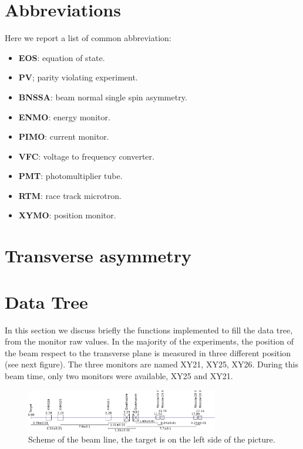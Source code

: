 \begin{appendices}

\section{Abbreviations}

Here we report a list of common abbreviation:

\begin{itemize}
\item \textbf{EOS}: equation of state.
\item \textbf{PV}; parity violating experiment.
\item \textbf{BNSSA}: beam normal single spin asymmetry.
\item \textbf{ENMO}: energy monitor.
\item \textbf{PIMO}: current monitor.
\item \textbf{VFC}: voltage to frequency converter.
\item \textbf{PMT}: photomultiplier tube.
\item \textbf{RTM}: race track microtron.
\item \textbf{XYMO}: position monitor.
\end{itemize} 

\section{Transverse asymmetry}

\section{Data Tree}

In this section we discuss briefly the functions implemented to fill the data tree, from the monitor raw values. In the majority of the \transv experiments, the position of the beam respect to the transverse plane is measured in three different position (see next figure). The three monitors are named XY21, XY25, XY26. During this beam time, only two monitors were available, XY25 and XY21. 

\begin{figure}[hbtp]
\centering
\includegraphics[width = 0.75\textwidth]{figures/XYMOCalibBeamLine.pdf}
\caption{Scheme of the beam line, the target is on the left side of the picture.}
\end{figure}


\end{appendices}
